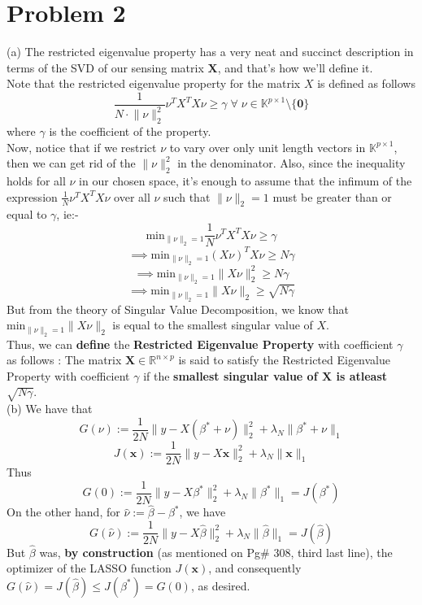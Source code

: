 \documentclass[a4paper,11pt]{article}
\numberwithin{definition}{section}
\numberwithin{mytheorem}{subsection}
\begin{document}
\section{Problem 2}
(a) The restricted eigenvalue property has a very neat and succinct description in terms of the SVD of our sensing matrix $\boldsymbol{X}$, and that's how we'll define it.\\
Note that the restricted eigenvalue property for the matrix $X$ is defined as follows
$$\frac{1}{N\cdot \lVert\nu\rVert_2^2}\nu^TX^TX\nu \geq \gamma \;\forall\;\nu \in \mathbb{K}^{p\times 1}\setminus\{\mathbf{0}\}$$
where $\gamma$ is the coefficient of the property.\\
Now, notice that if we restrict $\nu$ to vary over only unit length vectors in $\mathbb{K}^{p\times 1}$, then we can get rid of the $\lVert\nu\rVert_2^2$ in the denominator. Also, since the inequality holds for all $\nu$ in our chosen space, it's enough to assume that the infimum of the expression $\frac{1}{N}\nu^TX^TX\nu$ over all $\nu$ such that $\lVert\nu\rVert_2 = 1$ must be greater than or equal to $\gamma$, ie:- 
$$\mathrm{min}_{\lVert\nu\rVert_2 = 1}\frac{1}{N}\nu^TX^TX\nu \geq \gamma$$
$$\implies \mathrm{min}_{\lVert\nu\rVert_2 = 1}(X\nu)^TX\nu \geq N\gamma$$
$$\implies \mathrm{min}_{\lVert\nu\rVert_2 = 1}\lVert X\nu\rVert_2^2 \geq N\gamma$$
$$\implies \mathrm{min}_{\lVert\nu\rVert_2 = 1}\lVert X\nu\rVert_2 \geq \sqrt{N\gamma}$$
But from the theory of Singular Value Decomposition, we know that $\mathrm{min}_{\lVert\nu\rVert_2 = 1}\lVert X\nu\rVert_2$ is equal to the smallest singular value of $X$.\\
Thus, we can \textbf{define} the \textbf{Restricted Eigenvalue Property} with coefficient $\gamma$ as follows : The matrix $\boldsymbol{X}\in\mathbb{R}^{n\times p}$ is said to satisfy the Restricted Eigenvalue Property with coefficient $\gamma$ if the \textbf{smallest singular value of $\boldsymbol{X}$ is atleast $\sqrt{N\gamma}$}.\\
(b) We have that 
$$G(\nu) := \frac{1}{2N}\lVert y - X(\beta^{*} + \nu)\rVert^2_2 + \lambda_N\lVert\beta^{*} + \nu\rVert_1$$
$$J(\boldsymbol{x}) := \frac{1}{2N}\lVert y - X\boldsymbol{x}\rVert^2_2 + \lambda_N\lVert\boldsymbol{x}\rVert_1$$
Thus 
$$G(0) := \frac{1}{2N}\lVert y - X\beta^{*}\rVert^2_2 + \lambda_N\lVert\beta^{*}\rVert_1 = J(\beta^{*})$$
On the other hand, for $\hat{\nu} := \hat{\beta} - \beta^{*}$, we have
$$G(\hat{\nu}) := \frac{1}{2N}\lVert y - X\hat{\beta}\rVert^2_2 + \lambda_N\lVert\hat{\beta}\rVert_1 = J(\hat{\beta})$$
But $\hat{\beta}$ was, \textbf{by construction} (as mentioned on Pg\# 308, third last line), the optimizer of the LASSO function $J(\boldsymbol{x})$, and consequently $G(\hat{\nu}) = J(\hat{\beta}) \leq J(\beta^*) = G(0)$, as desired.\\
\end{document}
